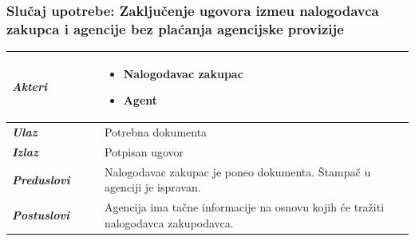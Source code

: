 \documentclass[20pt]{article}
\begin{document}
\newpage
{}
\setlength{\parindent}{1cm}
\fontsize{13}{18} \selectfont 


\subsubsection{\bfseries \large Slu\v{c}aj upotrebe: Zaklju\v {c}enje ugovora izme\dj u nalogodavca zakupca i agencije bez pla\' canja agencijske provizije}
\begin{center}
\begin{longtable}{p{0.23\linewidth} p{0.77\linewidth}}
 \hline
 {\it \bfseries Akteri} & \begin{itemize}
    \item Nalogodavac zakupac
    \item Agent
\end{itemize}\\
\hline

 {\it \bfseries Ulaz} & Potrebna dokumenta\\
 \hline
 
 {\it \bfseries Izlaz} & Potpisan ugovor\\
 \hline
 
 {\it \bfseries Preduslovi} & Nalogodavac zakupac je poneo dokumenta. \v {S}tampa\v {c} u agenciji je ispravan. \\
 \hline
 
 {\it \bfseries Postuslovi} & Agencija ima ta\v {c}ne informacije na osnovu kojih \' ce tra\v {z}iti nalogodavca zakupodavca. \\
 \hline


\end{longtable}
\end{center}
\end{document}
